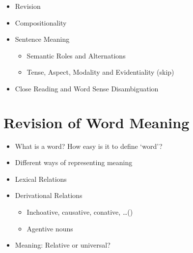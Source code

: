 \documentclass[a4paper,landscape,headrule,footrule,xetex]{foils}
\begin{document}
\maketitle

%



\begin{itemize}
\item Revision
\item Compositionality
\item Sentence Meaning
  \begin{itemize}
  \item Semantic Roles and Alternations
  \item Tense, Aspect, Modality and Evidentiality (skip)
  \end{itemize}
\item Close Reading and Word Sense Disambiguation
\end{itemize}

\section{Revision of Word Meaning}

\begin{itemize}
\item What is a word? How easy is it to define ‘word’?
\item Different ways of representing meaning
\item Lexical Relations
\item Derivational Relations
  \begin{itemize}
  \item Inchoative, causative, conative, \ldots ()
  \item Agentive nouns
  \end{itemize}
\item Meaning: Relative or universal?
\end{itemize}
\end{document}
